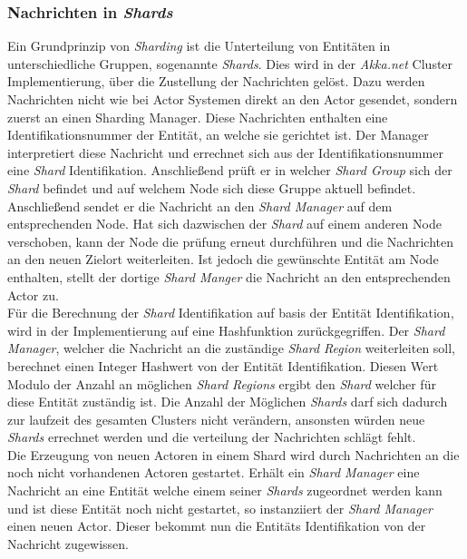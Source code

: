 \subsubsection{Nachrichten in \textit{Shards}}
Ein Grundprinzip von \textit{Sharding} ist die Unterteilung von Entitäten in unterschiedliche Gruppen, sogenannte \textit{Shards}. Dies wird in der \textit{Akka.net} Cluster Implementierung, über die Zustellung der Nachrichten gelöst. Dazu werden Nachrichten nicht wie bei Actor Systemen direkt an den Actor gesendet, sondern zuerst an einen Sharding Manager. Diese Nachrichten enthalten eine Identifikationsnummer der Entität, an welche sie gerichtet ist. Der Manager interpretiert diese Nachricht und errechnet sich aus der Identifikationsnummer eine \textit{Shard} Identifikation. Anschließend prüft er in welcher \textit{Shard Group} sich der \textit{Shard} befindet und auf welchem Node sich diese Gruppe aktuell befindet. Anschließend sendet er die Nachricht an den \textit{Shard Manager} auf dem entsprechenden Node. Hat sich dazwischen der \textit{Shard} auf einem anderen Node verschoben, kann der Node die prüfung erneut durchführen und die Nachrichten an den neuen Zielort weiterleiten. Ist jedoch die gewünschte Entität am Node enthalten, stellt der dortige \textit{Shard Manger} die Nachricht an den entsprechenden Actor zu. \\
Für die Berechnung der \textit{Shard} Identifikation auf basis der Entität Identifikation, wird in der Implementierung auf eine Hashfunktion zurückgegriffen. Der \textit{Shard Manager}, welcher die Nachricht an die zuständige \textit{Shard Region} weiterleiten soll, berechnet einen Integer Hashwert von der Entität Identifikation. Diesen Wert Modulo der Anzahl an möglichen \textit{Shard Regions} ergibt den \textit{Shard} welcher für diese Entität zuständig ist. Die Anzahl der Möglichen \textit{Shards} darf sich dadurch zur laufzeit des gesamten Clusters nicht verändern, ansonsten würden neue \textit{Shards} errechnet werden und die verteilung der Nachrichten schlägt fehlt. \\
Die Erzeugung von neuen Actoren in einem Shard wird durch Nachrichten an die noch nicht vorhandenen Actoren gestartet. Erhält ein \textit{Shard Manager} eine Nachricht an eine Entität welche einem seiner \textit{Shards} zugeordnet werden kann und ist diese Entität noch nicht gestartet, so instanziiert der \textit{Shard Manager} einen neuen Actor. Dieser bekommt nun die Entitäts Identifikation von der Nachricht zugewissen.
